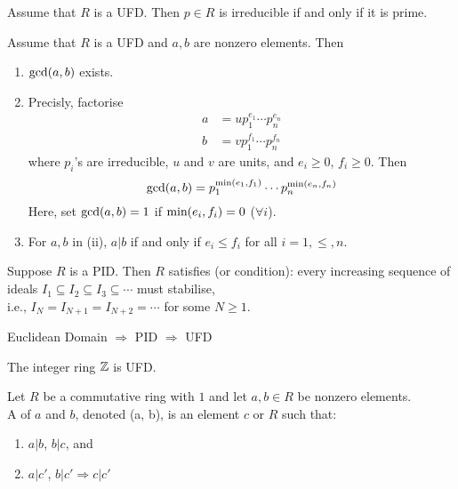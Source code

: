 \begin{proposition}
Assume that $R$ is a UFD. Then $p \in R$ is irreducible if and only if it is prime.	
\end{proposition}

\begin{proposition}
Assume that $R$ is a UFD and $a,b$ are nonzero elements. Then
\begin{enumerate}[label=(\roman*)]
\item $\textnormal{gcd}(a,b)$ exists.
\item Precisly, factorise
\begin{align}
a&=u p_1^{e_1} \cdots p_n^{e_n} \nonumber \\
b&=v p_1^{f_1} \cdots p_n^{f_n} \nonumber
\end{align}
where $p_i$'s are irreducible, $u$ and $v$ are units, and $e_i \geq 0$, $f_i \geq 0$. Then
\begin{equation}
\textnormal{gcd}(a,b) = p_1^{\textnormal{min}(e_1, f_1)} \cdots p_n^{\textnormal{min}(e_n, f_n)} \nonumber
\end{equation}
Here, set $\textnormal{gcd}(a,b) =1$ if $\textnormal{min}(e_i, f_i) = 0$ ($\forall i$).
\item For $a,b$ in (ii), $a|b$ if and only if $e_i \leq f_i$ for all $i=1, \leq, n$.
\end{enumerate}
\end{proposition}

\begin{definition}
Suppose $R$ is a PID. Then $R$ satisfies  (or  condition): every increasing sequence of ideals $I_1 \subseteq I_2 \subseteq I_3 \subseteq \cdots$ must stabilise, \\
i.e., $I_N = I_{N+1} = I_{N+2} = \cdots$ for some $N \geq 1$.
\end{definition}

\begin{proposition}
Euclidean Domain $\Rightarrow$ PID $\Rightarrow$ UFD
\end{proposition}

\begin{corollary}
 The integer ring $\mathbb{Z}$ is UFD.
\end{corollary}

\begin{definition}
Let $R$ be a commutative ring with $1$ and let $a,b \in R$ be nonzero elements.\\
A  of $a$ and $b$, denoted \lcms(a, b), is an element $c$ or $R$ such that:
\begin{enumerate}[label=(\roman*)]
\item $a|b$, $b|c$, and
\item $a|c'$, $b|c' \Rightarrow c|c'$ 
\end{enumerate}
\end{definition}


